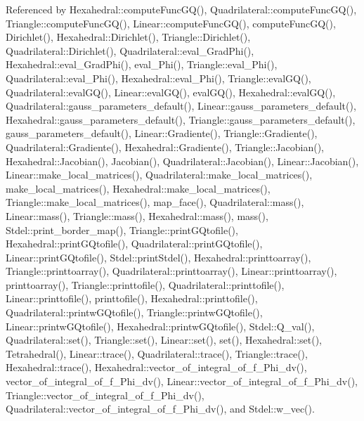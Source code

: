 Referenced by Hexahedral\+::compute\+Func\+G\+Q(), Quadrilateral\+::compute\+Func\+G\+Q(), Triangle\+::compute\+Func\+G\+Q(), Linear\+::compute\+Func\+G\+Q(), compute\+Func\+G\+Q(), Dirichlet(), Hexahedral\+::\+Dirichlet(), Triangle\+::\+Dirichlet(), Quadrilateral\+::\+Dirichlet(), Quadrilateral\+::eval\+\_\+\+Grad\+Phi(), Hexahedral\+::eval\+\_\+\+Grad\+Phi(), eval\+\_\+\+Phi(), Triangle\+::eval\+\_\+\+Phi(), Quadrilateral\+::eval\+\_\+\+Phi(), Hexahedral\+::eval\+\_\+\+Phi(), Triangle\+::eval\+G\+Q(), Quadrilateral\+::eval\+G\+Q(), Linear\+::eval\+G\+Q(), eval\+G\+Q(), Hexahedral\+::eval\+G\+Q(), Quadrilateral\+::gauss\+\_\+parameters\+\_\+default(), Linear\+::gauss\+\_\+parameters\+\_\+default(), Hexahedral\+::gauss\+\_\+parameters\+\_\+default(), Triangle\+::gauss\+\_\+parameters\+\_\+default(), gauss\+\_\+parameters\+\_\+default(), Linear\+::\+Gradiente(), Triangle\+::\+Gradiente(), Quadrilateral\+::\+Gradiente(), Hexahedral\+::\+Gradiente(), Triangle\+::\+Jacobian(), Hexahedral\+::\+Jacobian(), Jacobian(), Quadrilateral\+::\+Jacobian(), Linear\+::\+Jacobian(), Linear\+::make\+\_\+local\+\_\+matrices(), Quadrilateral\+::make\+\_\+local\+\_\+matrices(), make\+\_\+local\+\_\+matrices(), Hexahedral\+::make\+\_\+local\+\_\+matrices(), Triangle\+::make\+\_\+local\+\_\+matrices(), map\+\_\+face(), Quadrilateral\+::mass(), Linear\+::mass(), Triangle\+::mass(), Hexahedral\+::mass(), mass(), Stdel\+::print\+\_\+border\+\_\+map(), Triangle\+::print\+G\+Qtofile(), Hexahedral\+::print\+G\+Qtofile(), Quadrilateral\+::print\+G\+Qtofile(), Linear\+::print\+G\+Qtofile(), Stdel\+::print\+Stdel(), Hexahedral\+::printtoarray(), Triangle\+::printtoarray(), Quadrilateral\+::printtoarray(), Linear\+::printtoarray(), printtoarray(), Triangle\+::printtofile(), Quadrilateral\+::printtofile(), Linear\+::printtofile(), printtofile(), Hexahedral\+::printtofile(), Quadrilateral\+::printw\+G\+Qtofile(), Triangle\+::printw\+G\+Qtofile(), Linear\+::printw\+G\+Qtofile(), Hexahedral\+::printw\+G\+Qtofile(), Stdel\+::\+Q\+\_\+val(), Quadrilateral\+::set(), Triangle\+::set(), Linear\+::set(), set(), Hexahedral\+::set(), Tetrahedral(), Linear\+::trace(), Quadrilateral\+::trace(), Triangle\+::trace(), Hexahedral\+::trace(), Hexahedral\+::vector\+\_\+of\+\_\+integral\+\_\+of\+\_\+f\+\_\+\+Phi\+\_\+dv(), vector\+\_\+of\+\_\+integral\+\_\+of\+\_\+f\+\_\+\+Phi\+\_\+dv(), Linear\+::vector\+\_\+of\+\_\+integral\+\_\+of\+\_\+f\+\_\+\+Phi\+\_\+dv(), Triangle\+::vector\+\_\+of\+\_\+integral\+\_\+of\+\_\+f\+\_\+\+Phi\+\_\+dv(), Quadrilateral\+::vector\+\_\+of\+\_\+integral\+\_\+of\+\_\+f\+\_\+\+Phi\+\_\+dv(), and Stdel\+::w\+\_\+vec().

